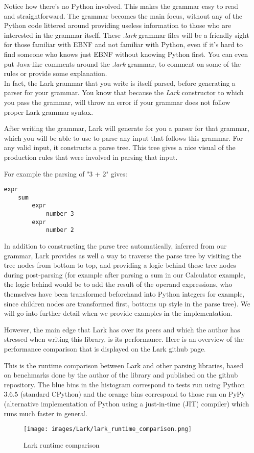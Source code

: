 \documentclass[12pt]{article}
\begin{document}
Notice how there's no Python involved. This makes the grammar easy to read and straightforward. The grammar becomes the main focus, without any of the Python code littered around providing useless information to those who are interested in the grammar itself. These \emph{.lark} grammar files will be a friendly sight for those familiar with EBNF and not familiar with Python, even if it's hard to find someone who knows just EBNF without knowing Python first. You can even put Java-like comments around the \emph{.lark} grammar, to comment on some of the rules or provide some explanation. \\
In fact, the Lark grammar that you write is itself parsed, before generating a parser for your grammar. You know that because the \emph{Lark} constructor to which you pass the grammar, will throw an error if your grammar does not follow proper Lark grammar syntax.

After writing the grammar, Lark will generate for you a parser for that grammar, which you will be able to use to parse any input that follows this grammar. For any valid input, it constructs a parse tree. This tree gives a nice visual of the production rules that were involved in parsing that input.

For example the parsing of "3 + 2" gives:
\begin{lstlisting}
expr
    sum
        expr
            number 3
        expr
            number 2
\end{lstlisting}

In addition to constructing the parse tree automatically, inferred from our grammar, Lark provides as well a way to traverse the parse tree by visiting the tree nodes from bottom to top, and providing a logic behind these tree nodes during post-parsing (for example after parsing a sum in our Calculator example, the logic behind would be to add the result of the operand expressions, who themselves have been transformed beforehand into Python integers for example, since children nodes are transformed first, bottoms up style in the parse tree). We will go into further detail when we provide examples in the implementation.

However, the main edge that Lark has over its peers and which the author has stressed when writing this library, is its performance. Here is an overview of the performance comparison that is displayed on the Lark github page.

This is the runtime comparison between Lark and other parsing libraries, based on benchmarks done by the author of the library and published on the github repository. The blue bins in the histogram correspond to tests run using Python 3.6.5 (standard CPython) and the orange bins correspond to those run on PyPy (alternative implementation of Python using a just-in-time (JIT) compiler) which runs much faster in general.
\begin{figure}[ht!]
 	\centering
 	\caption{Lark runtime comparison}
 	\texttt{[image: images/Lark/lark\_runtime\_comparison.png]}
 	\label{lab:perceptron}
\end{figure}
\end{document}
